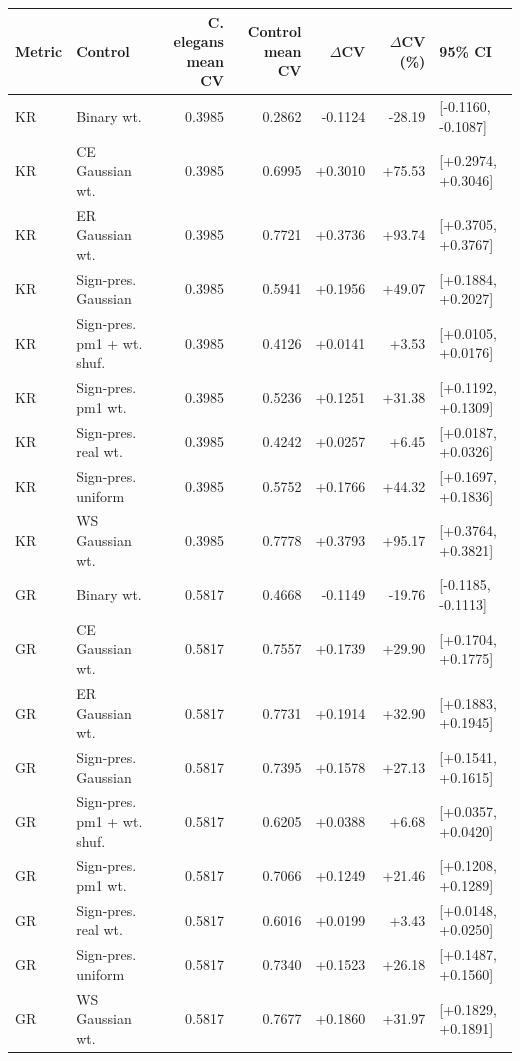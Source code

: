 \begin{tabular}{llrrrrl}
\toprule
Metric & Control & C. elegans mean CV & Control mean CV & $\Delta$CV & $\Delta$CV (\%) & 95\% CI \\
\midrule
KR & Binary wt. & 0.3985 & 0.2862 & -0.1124 & -28.19 & [-0.1160, -0.1087] \\
KR & CE Gaussian wt. & 0.3985 & 0.6995 & +0.3010 & +75.53 & [+0.2974, +0.3046] \\
KR & ER Gaussian wt. & 0.3985 & 0.7721 & +0.3736 & +93.74 & [+0.3705, +0.3767] \\
KR & Sign-pres. Gaussian & 0.3985 & 0.5941 & +0.1956 & +49.07 & [+0.1884, +0.2027] \\
KR & Sign-pres. pm1 + wt. shuf. & 0.3985 & 0.4126 & +0.0141 & +3.53 & [+0.0105, +0.0176] \\
KR & Sign-pres. pm1 wt. & 0.3985 & 0.5236 & +0.1251 & +31.38 & [+0.1192, +0.1309] \\
KR & Sign-pres. real wt. & 0.3985 & 0.4242 & +0.0257 & +6.45 & [+0.0187, +0.0326] \\
KR & Sign-pres. uniform & 0.3985 & 0.5752 & +0.1766 & +44.32 & [+0.1697, +0.1836] \\
KR & WS Gaussian wt. & 0.3985 & 0.7778 & +0.3793 & +95.17 & [+0.3764, +0.3821] \\
GR & Binary wt. & 0.5817 & 0.4668 & -0.1149 & -19.76 & [-0.1185, -0.1113] \\
GR & CE Gaussian wt. & 0.5817 & 0.7557 & +0.1739 & +29.90 & [+0.1704, +0.1775] \\
GR & ER Gaussian wt. & 0.5817 & 0.7731 & +0.1914 & +32.90 & [+0.1883, +0.1945] \\
GR & Sign-pres. Gaussian & 0.5817 & 0.7395 & +0.1578 & +27.13 & [+0.1541, +0.1615] \\
GR & Sign-pres. pm1 + wt. shuf. & 0.5817 & 0.6205 & +0.0388 & +6.68 & [+0.0357, +0.0420] \\
GR & Sign-pres. pm1 wt. & 0.5817 & 0.7066 & +0.1249 & +21.46 & [+0.1208, +0.1289] \\
GR & Sign-pres. real wt. & 0.5817 & 0.6016 & +0.0199 & +3.43 & [+0.0148, +0.0250] \\
GR & Sign-pres. uniform & 0.5817 & 0.7340 & +0.1523 & +26.18 & [+0.1487, +0.1560] \\
GR & WS Gaussian wt. & 0.5817 & 0.7677 & +0.1860 & +31.97 & [+0.1829, +0.1891] \\
\bottomrule
\end{tabular}
